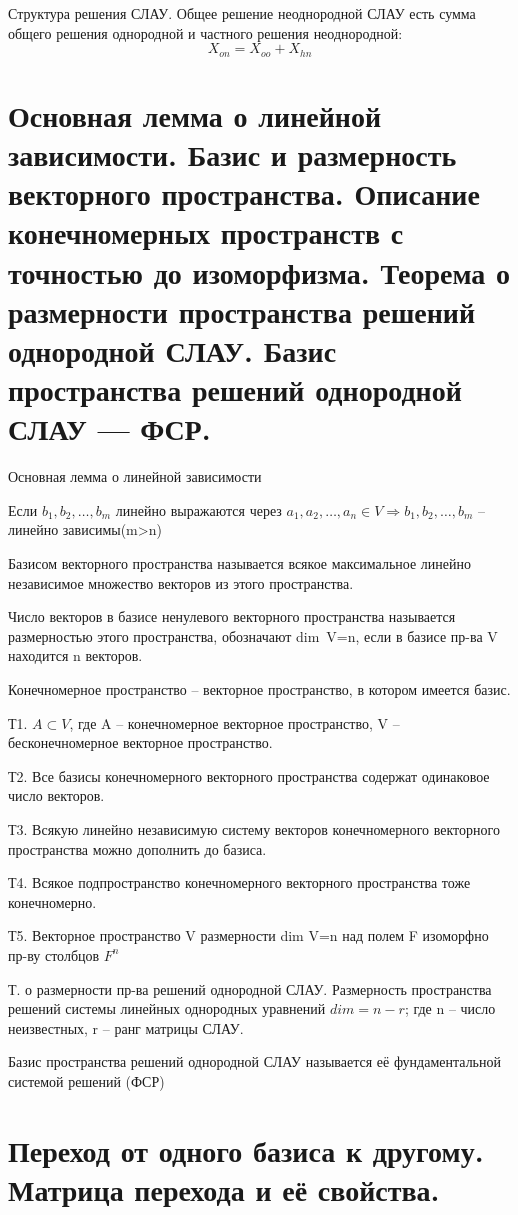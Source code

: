 \documentclass{article}
\begin{document}
\textsf{Структура решения СЛАУ.} Общее решение неоднородной СЛАУ есть сумма общего решения однородной и частного решения неоднородной:
$$X_{on}=X_{oo}+X_{hn}$$

\section{Основная лемма о линейной зависимости. Базис и размерность векторного пространства. Описание конечномерных пространств с точностью до изоморфизма. Теорема о размерности пространства решений однородной СЛАУ. Базис пространства решений однородной СЛАУ — ФСР.}

\textsf{Основная лемма о линейной зависимости} 

Если $b_1,b_2,\dots,b_m$ линейно выражаются через $a_1,a_2,\dots,a_n\in V\Rightarrow b_1,b_2,\dots,b_m$ – линейно зависимы(m>n)

\textsf{Базисом} векторного пространства называется всякое максимальное линейно независимое множество векторов из этого пространства.

Число векторов в базисе ненулевого векторного пространства называется \textsf{размерностью} этого пространства, обозначают dim\ V=n, если в базисе пр-ва V находится n векторов.

\textsf{Конечномерное пространство} – векторное пространство, в котором имеется базис.

Т1. $A\subset V$, где A – конечномерное векторное пространство, V – бесконечномерное векторное пространство.

Т2. Все базисы конечномерного векторного пространства содержат одинаковое число векторов.

Т3. Всякую линейно независимую систему векторов конечномерного векторного пространства можно дополнить до базиса.

Т4. Всякое подпространство конечномерного векторного пространства тоже конечномерно.

Т5. Векторное пространство V размерности dim V=n над полем F изоморфно пр-ву столбцов $F^n$

\textsf{Т. о размерности пр-ва решений однородной СЛАУ.} Размерность пространства решений системы линейных однородных уравнений $dim=n-r$; где n – число неизвестных, r – ранг матрицы СЛАУ.

Базис пространства решений однородной СЛАУ называется её фундаментальной системой решений (ФСР)

\section{Переход от одного базиса к другому. Матрица перехода и её свойства.}
\end{document}
